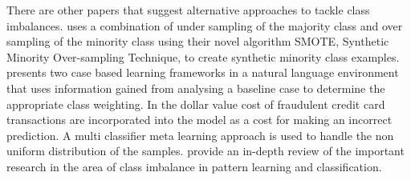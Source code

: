 There are other papers that suggest alternative approaches to tackle class imbalances. \citet{chawla_smote:_2002} uses a combination of under sampling of the majority class and over sampling of the minority class using their novel algorithm SMOTE, Synthetic Minority Over-sampling Technique, to create synthetic minority class examples.\citet{cardie_improving_1997} presents two case based learning frameworks in a natural language environment that uses information gained from analysing a baseline case to determine the appropriate class weighting. In \citet{chan_toward_1998} the dollar value cost of fraudulent credit card transactions are incorporated into the model as a cost for making an incorrect prediction. A multi classifier meta learning approach is used to handle the non uniform distribution of the samples. \citet{Garcia:2007} provide an in-depth review of the important research in the area of class imbalance in pattern learning and classification.
 
 
 
 
 
 
 